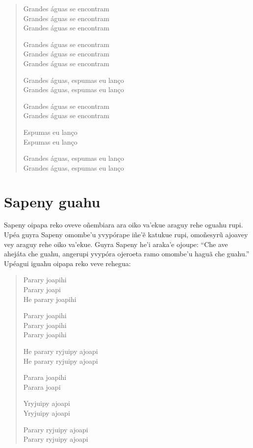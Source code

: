 \begin{verse}
Grandes águas se encontram\\
Grandes águas se encontram\\
Grandes águas se encontram

Grandes águas se encontram\\
Grandes águas se encontram\\
Grandes águas se encontram

Grandes águas, espumas eu lanço\\
Grandes águas, espumas eu lanço

Grandes águas se encontram\\
Grandes águas se encontram

Espumas eu lanço\\
Espumas eu lanço \EP[1]

Grandes águas, espumas eu lanço\\
Grandes águas, espumas eu lanço
\end{verse}

\chapter{Sapeny guahu}

 Sapeny oipapa reko oveve oñembiara ara oiko va'ekue araguy rehe
oguahu rupi. Upéa guyra Sapeny omombe'u yvypórape iñe'ẽ katukue rupi,
omoñesyrũ ajoavey vey araguy rehe oiko va'ekue. Guyra Sapeny he'i
araka'e ojoupe: ``Che ave ahejáta che guahu, angerupi yvypóra ojeroeta
ramo omombe'u haguã che guahu.'' Upéagui iguahu oipapa reko veve
rehegua:

\begin{verse}
Parary joapihi\\
Parary joapi\\
He parary joapihi

Parary joapihi\\
Parary joapihi\\
Parary joapihi

He parary ryjuipy ajoapi\\
He parary ryjuipy ajoapi

Parara joapihi\\
Parara joapi

Yryjuipy ajoapi\\
Yryjuipy ajoapi

Parary ryjuipy ajoapi\\
Parary ryjuipy ajoapi
\end{verse}


